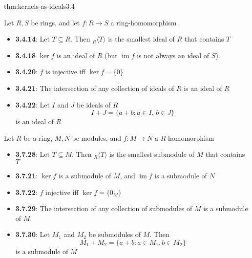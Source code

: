 \documentclass[landscape, 8pt]{extarticle}
\DeclareMathOperator{\im}{im}
\begin{document}
\begin{multicols}{3}
\begin{thm}{thm:kernels-as-ideals}{3.4}
    \vspace{-17pt}
    \setlength{\columnseprule}{0.5pt}
    \begin{multicols}{2}
        Let $R, S$ be rings, and let $f: R\to S$ a ring-homomorphism


        \begin{itemize}[leftmargin=-2pt]
            \item[] \textbf{3.4.14}: Let $T\subseteq R$. Then ${}_{R}\langle T \rangle$ is the smallest ideal of $R$ that contains $T$
            \item[] \textbf{3.4.18} $\ker f$ is an ideal of $R$ (but $\im f$ is not always an ideal of $S$).
            \item[] \textbf{3.4.20}: $f$ is injective iff $\ker f = \{0\}$
            \item[] \textbf{3.4.21}: The intersection of any collection of ideals of $R$ is an ideal of $R$
            \item[] \textbf{3.4.22}: Let $I$ and $J$ be ideals of $R$
            \[I + J = \{a + b : a\in I,\, b\in J\}\]
            is an ideal of $R$
        \end{itemize}
    
        \columnbreak


        Let $R$ be a ring, $M, N$ be modules, and $f: M\to N$ a $R$-homomorphism
        \begin{itemize}[leftmargin=-2pt]

            \item[] \textbf{3.7.28}: Let $T \subseteq M$. Then ${}_{R}\langle T \rangle$ is the smallest submodule of $M$ that contains $T$
            \item[] \textbf{3.7.21}: $\ker f$ is a submodule of $M$, and $\im f$ is a submodule of $N$
            \item[] \textbf{3.7.22}: $f$ injective iff $\ker f = \{0_{M}\}$
            \item[] \textbf{3.7.29}: The intersection of any collection of submodules of $M$ is a submodule of $M$.
            \item[] \textbf{3.7.30}: Let $M_{1}$ and $M_{2}$ be submodules of $M$. Then
            \[M_{1} + M_{2} = \{a + b : a\in M_{1}, b\in M_{2}\}\]
            is a submodule of $M$
        \end{itemize}
    \end{multicols}

    \vspace{-10pt}
\end{thm}


\end{multicols}
\end{document}
